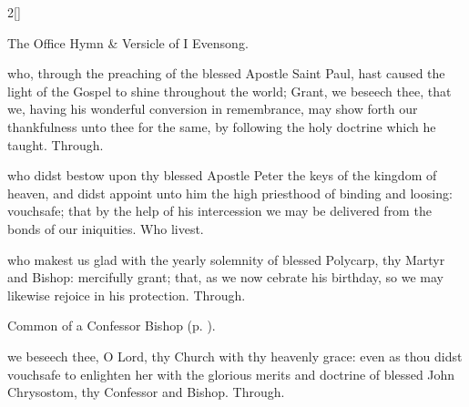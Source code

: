 \begin{paracol}{2}[]

\secondEvensong


\begin{rubric}
	The Office Hymn \& Versicle of I Evensong.
\end{rubric}


\fussy
\end{paracol}

\collect
{} who, through the preaching of the blessed Apostle Saint Paul, hast caused the light of the Gospel to shine throughout the world; Grant, we beseech thee, that we, having his wonderful conversion in remembrance, may show forth our thankfulness unto thee for the same, by following the holy doctrine which he taught. Through.

 who didst bestow upon thy blessed Apostle Peter the keys of the kingdom of heaven, and didst appoint unto him the high priesthood of binding and loosing: vouchsafe; that by the help of his intercession we may be delivered from the bonds of our iniquities. Who livest.



\memorialCollect
{} who makest us glad with the yearly solemnity of blessed Polycarp, thy Martyr and Bishop: mercifully grant; that, as we now cebrate his birthday, so we may likewise rejoice in his protection. Through.


\clearpage
{}

\begin{rubric}
	Common of a Confessor Bishop (p. \pageref{CommonConfessorBishop}).
\end{rubric}

{} we beseech thee, O Lord, thy Church with thy heavenly grace: even as thou didst vouchsafe to enlighten her with the glorious merits and doctrine of blessed John Chrysostom, thy Confessor and Bishop. Through.


